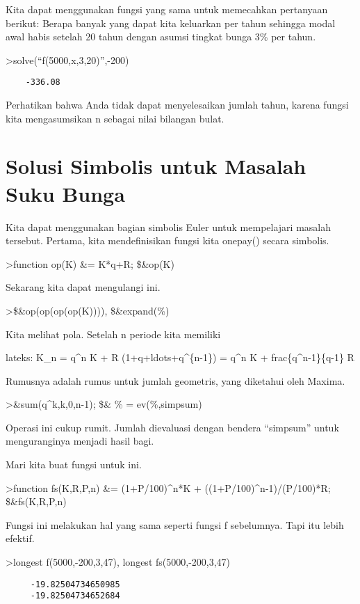 \documentclass[
]{book}
\begin{document}
Kita dapat menggunakan fungsi yang sama untuk memecahkan pertanyaan berikut: Berapa banyak yang dapat kita keluarkan per tahun sehingga modal awal habis setelah 20 tahun dengan asumsi tingkat bunga 3\% per tahun.

\textgreater solve(``f(5000,x,3,20)'',-200)

\begin{verbatim}
    -336.08 
\end{verbatim}

Perhatikan bahwa Anda tidak dapat menyelesaikan jumlah tahun, karena fungsi kita mengasumsikan n sebagai nilai bilangan bulat.

\section{Solusi Simbolis untuk Masalah Suku Bunga}\label{solusi-simbolis-untuk-masalah-suku-bunga}

Kita dapat menggunakan bagian simbolis Euler untuk mempelajari masalah tersebut. Pertama, kita mendefinisikan fungsi kita onepay() secara simbolis.

\textgreater function op(K) \&= K*q+R; \$\&op(K)

Sekarang kita dapat mengulangi ini.

\textgreater\$\&op(op(op(op(K)))), \$\&expand(\%)

Kita melihat pola. Setelah n periode kita memiliki

lateks: K\_n = q\^{}n K + R (1+q+ldots+q\^{}\{n-1\}) = q\^{}n K + frac\{q\^{}n-1\}\{q-1\} R

Rumusnya adalah rumus untuk jumlah geometris, yang diketahui oleh Maxima.

\textgreater\&sum(q\^{}k,k,0,n-1); \$\& \% = ev(\%,simpsum)

Operasi ini cukup rumit. Jumlah dievaluasi dengan bendera ``simpsum'' untuk menguranginya menjadi hasil bagi.

Mari kita buat fungsi untuk ini.

\textgreater function fs(K,R,P,n) \&= (1+P/100)\^{}n*K + ((1+P/100)\^{}n-1)/(P/100)*R; \$\&fs(K,R,P,n)

Fungsi ini melakukan hal yang sama seperti fungsi f sebelumnya. Tapi itu lebih efektif.

\textgreater longest f(5000,-200,3,47), longest fs(5000,-200,3,47)

\begin{verbatim}
     -19.82504734650985 
     -19.82504734652684 
\end{verbatim}
\end{document}

